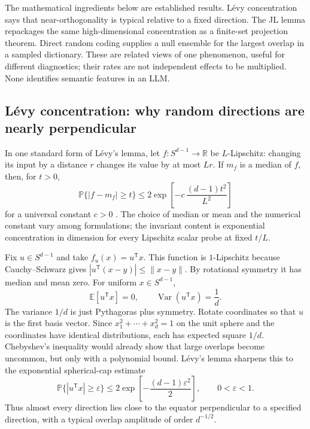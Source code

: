 \documentclass[
  aps,
  reprint,
  superscriptaddress,
  floatfix,
  nofootinbib,
  longbibliography
]{revtex4-2}
\newcommand{\R}{\mathbb{R}}
\newcommand{\E}{\mathbb{E}}
\newcommand{\Prob}{\mathbb{P}}
\newcommand{\Sph}[1]{S^{#1}}
\newcommand{\T}{^{\mathsf{T}}}
\newcommand{\norm}[1]{\lVert #1 \rVert}
\DeclareMathOperator{\Var}{Var}
\begin{document}
The mathematical ingredients below are established results.  L\'evy
concentration says that near-orthogonality is typical relative to a fixed
direction.  The JL lemma repackages the same high-dimensional concentration as
a finite-set projection theorem.  Direct random coding supplies a null
ensemble for the largest overlap in a sampled dictionary.  These are related
views of one phenomenon, useful for different diagnostics; their rates are not
independent effects to be multiplied.  None identifies semantic features in
an LLM.

\subsection{L\'evy concentration: why random directions are nearly perpendicular}
\label{sec:levy}

In one standard form of L\'evy's lemma, let
$f:\Sph{d-1}\rightarrow\R$ be $L$-Lipschitz: changing its input by a distance
$r$ changes its value by at most $Lr$.  If $m_f$ is a median of $f$, then, for
$t>0$,
\begin{equation}
\label{eq:levy-general}
\Prob\{|f-m_f|\geq t\}
\leq
2\exp\!\left[-c\,\frac{(d-1)t^2}{L^2}\right]
\end{equation}
for a universal constant $c>0$
\cite{ledoux2001concentration,milman1986asymptotic}.  The choice of median or
mean and the numerical constant vary among formulations; the invariant
content is exponential concentration in dimension for every Lipschitz scalar
probe at fixed $t/L$.

Fix $u\in\Sph{d-1}$ and take $f_u(x)=u\T x$.  This function is
$1$-Lipschitz because Cauchy--Schwarz gives
$|u\T(x-y)|\leq\norm{x-y}$.  By rotational symmetry it has median and mean
zero.  For
uniform $x\in\Sph{d-1}$,
\begin{equation}
\label{eq:moments}
\E[u\T x]=0,
\qquad
\Var(u\T x)=\frac{1}{d}.
\end{equation}
The variance $1/d$ is just Pythagoras plus symmetry.  Rotate coordinates so
that $u$ is the first basis vector.  Since
$x_1^2+\cdots+x_d^2=1$ on the unit sphere and the coordinates have identical
distributions, each has expected square $1/d$.  Chebyshev's inequality would
already show that large overlaps become uncommon, but only with a polynomial
bound.  L\'evy's lemma sharpens this to the exponential spherical-cap estimate
\begin{equation}
\label{eq:overlap}
\Prob\{|u\T x|\geq\varepsilon\}
\leq
2\exp\!\left[-\frac{(d-1)\varepsilon^2}{2}\right],
\qquad 0<\varepsilon<1.
\end{equation}
Thus almost every direction lies close to the equator perpendicular to a
specified direction, with a typical overlap amplitude of order
$d^{-1/2}$.
\end{document}
